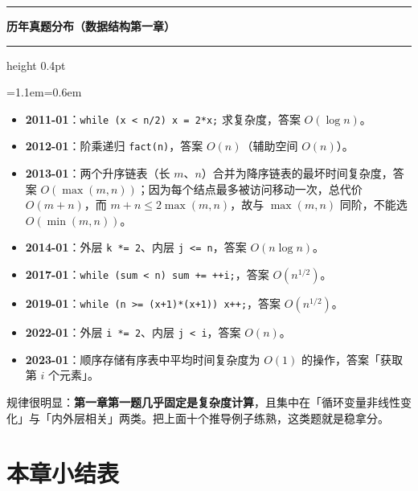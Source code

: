 \documentclass[11pt,openany,UTF8]{ctexbook}
\newcommand{\callouthead}[2]{%
  \par\addvspace{7pt}\noindent
  {\color{#1}\rule[-0.15em]{3pt}{1.05em}}\hspace{0.5em}%
  {\bfseries\color{#1}#2}\par\nobreak\vspace{-0.35em}%
  {\color{rulesep}\hrule height 0.4pt}\nobreak\vspace{0.45em}%
  \begingroup\small\setlength{\parindent}{0pt}%
  \leftskip=1.1em\rightskip=0.6em\noindent\ignorespaces}
\newcommand{\calloutend}{\par\endgroup\addvspace{7pt}}
\newenvironment{callexam}[1]{\callouthead{exambar}{#1}}{\calloutend}
\begin{document}
\begin{callexam}{历年真题分布（数据结构第一章）}
\begin{itemize}
\item \textbf{2011-01}：\texttt{while (x <\allowbreak{} n/\allowbreak{}2)\allowbreak{} x =\allowbreak{} 2*x;\allowbreak{}} 求复杂度，答案 $O(\log n)$。
\item \textbf{2012-01}：阶乘递归 \texttt{fact(n)\allowbreak{}}，答案 $O(n)$（辅助空间 $O(n)$）。
\item \textbf{2013-01}：两个升序链表（长 $m$、$n$）合并为降序链表的最坏时间复杂度，答案 $O(\max(m,n))$；因为每个结点最多被访问移动一次，总代价 $O(m+n)$，而 $m+n \le 2\max(m,n)$，故与 $\max(m,n)$ 同阶，不能选 $O(\min(m,n))$。
\item \textbf{2014-01}：外层 \texttt{k *=\allowbreak{} 2}、内层 \texttt{j <\allowbreak{}=\allowbreak{} n}，答案 $O(n\log n)$。
\item \textbf{2017-01}：\texttt{while (sum <\allowbreak{} n)\allowbreak{} sum +\allowbreak{}=\allowbreak{} +\allowbreak{}+\allowbreak{}i;\allowbreak{}}，答案 $O(n^{1/2})$。
\item \textbf{2019-01}：\texttt{while (n >\allowbreak{}=\allowbreak{} (x+\allowbreak{}1)\allowbreak{}*(x+\allowbreak{}1)\allowbreak{})\allowbreak{} x+\allowbreak{}+\allowbreak{};\allowbreak{}}，答案 $O(n^{1/2})$。
\item \textbf{2022-01}：外层 \texttt{i *=\allowbreak{} 2}、内层 \texttt{j <\allowbreak{} i}，答案 $O(n)$。
\item \textbf{2023-01}：顺序存储有序表中平均时间复杂度为 $O(1)$ 的操作，答案「获取第 $i$ 个元素」。
\end{itemize}
规律很明显：\textbf{第一章第一题几乎固定是复杂度计算}，且集中在「循环变量非线性变化」与「内外层相关」两类。把上面十个推导例子练熟，这类题就是稳拿分。

\end{callexam}

\section*{本章小结表}
\end{document}
